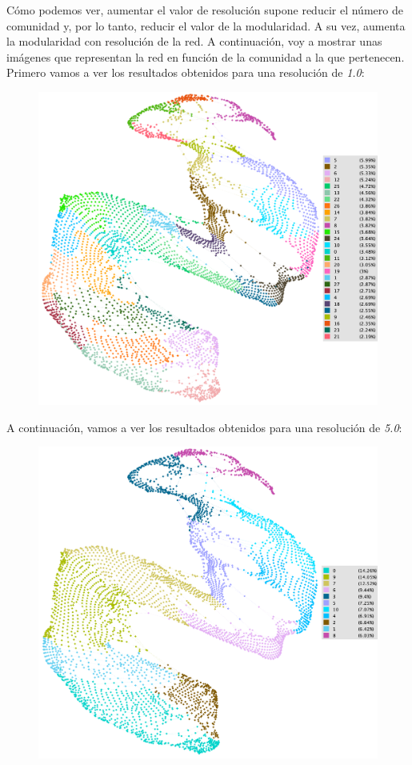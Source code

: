 \documentclass[11pt]{article}
\begin{document}
Cómo podemos ver, aumentar el valor de resolución supone reducir el número de comunidad y, por lo tanto, reducir el valor de la modularidad. A su vez, aumenta la modularidad con resolución de la red. A continuación, voy a mostrar unas imágenes que representan la red en función de la comunidad a la que pertenecen. Primero vamos a ver los resultados obtenidos para una resolución de \textit{1.0}:

\begin{figure}[H]
	\centering
	\includegraphics[width=\linewidth]{images/2_3_1_lovaina.png}
\end{figure}

A continuación, vamos a ver los resultados obtenidos para una resolución de \textit{5.0}:

\begin{figure}[H]
	\centering
	\includegraphics[width=\linewidth]{images/2_3_5_lovaina.png}
\end{figure}
\end{document}
